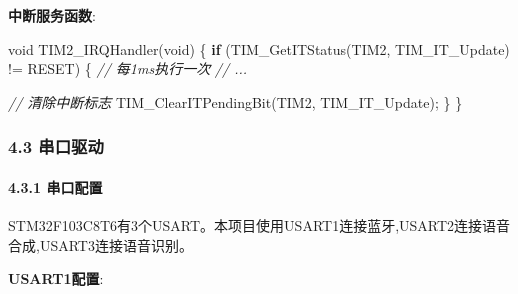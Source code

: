 \documentclass[
]{article}
\newenvironment{Shaded}{}{}
\newcommand{\CommentTok}[1]{\textcolor[rgb]{0.38,0.63,0.69}{\textit{#1}}}
\newcommand{\ControlFlowTok}[1]{\textcolor[rgb]{0.00,0.44,0.13}{\textbf{#1}}}
\newcommand{\DataTypeTok}[1]{\textcolor[rgb]{0.56,0.13,0.00}{#1}}
\newcommand{\NormalTok}[1]{#1}
\begin{document}
\textbf{中断服务函数}:

\begin{Shaded}
\begin{Highlighting}[]
\DataTypeTok{void}\NormalTok{ TIM2\_IRQHandler(}\DataTypeTok{void}\NormalTok{)}
\NormalTok{\{}
    \ControlFlowTok{if}\NormalTok{ (TIM\_GetITStatus(TIM2, TIM\_IT\_Update) != RESET) \{}
        \CommentTok{// 每1ms执行一次}
        \CommentTok{// ...}
        
        \CommentTok{// 清除中断标志}
\NormalTok{        TIM\_ClearITPendingBit(TIM2, TIM\_IT\_Update);}
\NormalTok{    \}}
\NormalTok{\}}
\end{Highlighting}
\end{Shaded}

\hypertarget{ux4e32ux53e3ux9a71ux52a8}{%
\subsubsection{4.3 串口驱动}\label{ux4e32ux53e3ux9a71ux52a8}}

\hypertarget{ux4e32ux53e3ux914dux7f6e}{%
\paragraph{4.3.1 串口配置}\label{ux4e32ux53e3ux914dux7f6e}}

STM32F103C8T6有3个USART。本项目使用USART1连接蓝牙,USART2连接语音合成,USART3连接语音识别。

\textbf{USART1配置}:
\end{document}
